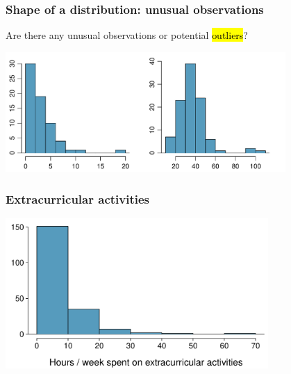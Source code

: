 \begin{frame}
\frametitle{Shape of a distribution: unusual observations}

Are there any unusual observations or potential \hl{outliers}?

\begin{center}
\includegraphics[width=0.8\textwidth]{2-1_numerical_data/figures/outlierPlots/outlierPlots}
\end{center}

\end{frame}


\begin{frame}
\frametitle{Extracurricular activities}


\begin{center}
\includegraphics[width=0.75\textwidth]{2-1_numerical_data/figures/extracurr_hrs_hist/extracurr_hrs_hist}
\end{center}


\end{frame}


